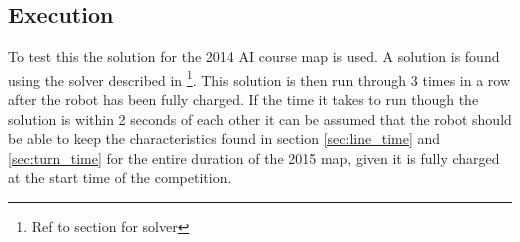 \documentclass[a4paper,10pt]{article}
\begin{document}
\subsection{Execution}
To test this the solution for the 2014 AI course map is used. A solution is found using the solver described in \footnote{Ref to section for solver}. This solution is then run through 3 times in a row after the robot has been fully charged. If the time it takes to run though the solution is within 2 seconds of each other it can be assumed that the robot should be able to keep the characteristics found in section \ref{sec:line_time} and \ref{sec:turn_time} for the entire duration of the 2015 map, given it is fully charged at the start time of the competition.
\end{document}
